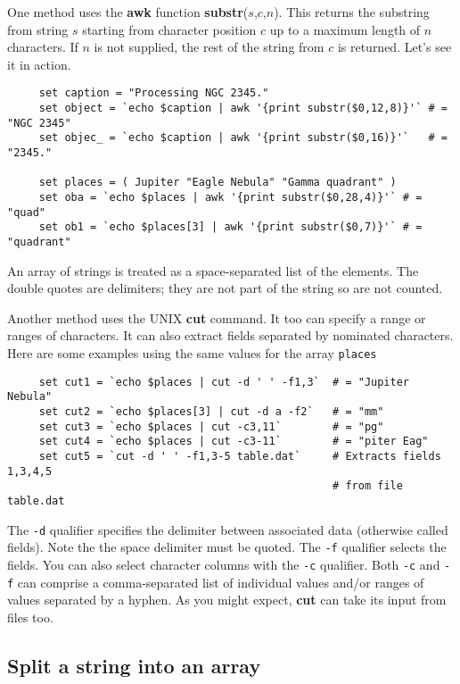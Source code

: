 One method uses the {\bf awk} function {\bf substr}($s$,$c$,$n$).  This
returns the substring from string $s$ starting from character position
$c$ up to a maximum length of $n$ characters.  If $n$ is not supplied,
the rest of the string from $c$ is returned.  Let's see it in action.

\small
\begin{verbatim}
     set caption = "Processing NGC 2345."
     set object = `echo $caption | awk '{print substr($0,12,8)}'` # = "NGC 2345"
     set objec_ = `echo $caption | awk '{print substr($0,16)}'`   # = "2345."

     set places = ( Jupiter "Eagle Nebula" "Gamma quadrant" )
     set oba = `echo $places | awk '{print substr($0,28,4)}'` # = "quad"
     set ob1 = `echo $places[3] | awk '{print substr($0,7)}'` # = "quadrant"
\end{verbatim}
\normalsize
An array of strings is treated as a space-separated list of the elements.
The double quotes are delimiters; they are not part of the string so
are not counted.

Another method uses the UNIX {\bf cut} command.  It too can specify a
range or ranges of characters.  It can also extract fields separated
by nominated characters.  Here are some examples using the same values
for the array {\tt places}

\small
\begin{verbatim}
     set cut1 = `echo $places | cut -d ' ' -f1,3`  # = "Jupiter Nebula"
     set cut2 = `echo $places[3] | cut -d a -f2`   # = "mm"
     set cut3 = `echo $places | cut -c3,11`        # = "pg"
     set cut4 = `echo $places | cut -c3-11`        # = "piter Eag"
     set cut5 = `cut -d ' ' -f1,3-5 table.dat`     # Extracts fields 1,3,4,5
                                                   # from file table.dat

\end{verbatim}
\normalsize

The {\tt -d} qualifier specifies the delimiter between associated data
(otherwise called fields).  Note the the space delimiter must be quoted.
The {\tt -f} qualifier selects the fields.  You can also select
character columns with the {\tt -c} qualifier.  Both {\tt -c} and
{\tt -f} can comprise a comma-separated list of individual values and/or
ranges of values separated by a hyphen.  As you might expect,
{\bf cut} can take its input from files too.


\subsection{Split a string into an
array\label{sc4_se_string_split}}

